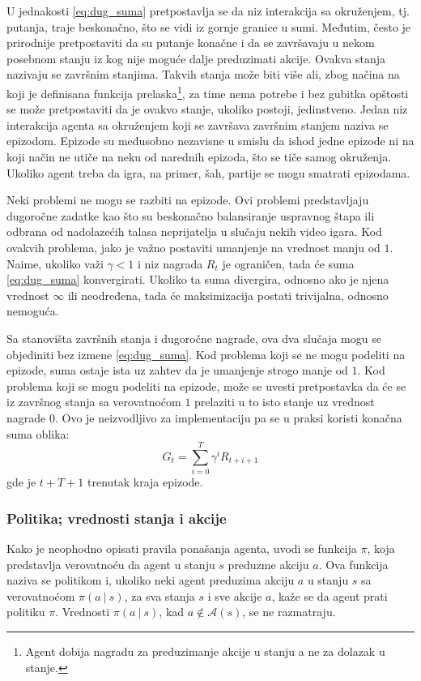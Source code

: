 U jednakosti \eqref{eq:dug_suma} pretpostavlja se da niz interakcija sa okruženjem, tj. putanja, traje beskonačno, što se vidi iz gornje granice u sumi. Međutim, često je prirodnije pretpostaviti da su putanje konačne i da se završavaju u nekom posebnom stanju iz kog nije moguće dalje preduzimati akcije. Ovakva stanja nazivaju se završnim stanjima. Takvih stanja može biti više ali, zbog načina na koji je definisana funkcija prelaska\footnote{Agent dobija nagradu za preduzimanje akcije u stanju a ne za dolazak u stanje.}, za time nema potrebe i bez gubitka opštosti se može pretpostaviti da je ovakvo stanje, ukoliko postoji, jedinstveno. Jedan niz interakcija agenta sa okruženjem koji se završava završnim stanjem naziva se epizodom. Epizode su međusobno nezavisne u smislu da ishod jedne epizode ni na koji način ne utiče na neku od narednih epizoda, što se tiče samog okruženja. Ukoliko agent treba da igra, na primer, šah, partije se mogu smatrati epizodama. 
\par 
Neki problemi ne mogu se razbiti na epizode. Ovi problemi predstavljaju dugoročne zadatke kao što su beskonačno balansiranje uspravnog štapa ili odbrana od nadolazećih talasa neprijatelja u slučaju nekih video igara. Kod ovakvih problema, jako je važno postaviti umanjenje na vrednost manju od $1$. Naime, ukoliko važi $\gamma < 1$ i niz nagrada $R_t$ je ograničen, tada će suma \eqref{eq:dug_suma} konvergirati. Ukoliko ta suma divergira, odnosno ako je njena vrednost $\infty$ ili neodređena, tada će maksimizacija postati trivijalna, odnosno nemoguća.
\par 
Sa stanovišta završnih stanja i dugoročne nagrade, ova dva slučaja mogu se objediniti bez izmene \eqref{eq:dug_suma}. Kod problema koji se ne mogu podeliti na epizode, suma ostaje ista uz zahtev da je umanjenje strogo manje od $1$. Kod problema koji se mogu podeliti na epizode, može se uvesti pretpostavka da će se iz završnog stanja sa verovatnoćom $1$ prelaziti u to isto stanje uz vrednost nagrade $0$. Ovo je neizvodljivo za implementaciju pa se u praksi koristi konačna suma oblika:
\begin{equation}
	G_t = \sum_{i=0}^{T} \gamma^iR_{t+i+1}
\end{equation}
gde je $t+T+1$ trenutak kraja epizode. 

\subsubsection{Politika; vrednosti stanja i akcije}

Kako je neophodno opisati pravila ponašanja agenta, uvodi se funkcija $\pi$, koja predstavlja verovatnoću da agent u stanju $s$ preduzme akciju $a$. Ova funkcija naziva se politikom i, ukoliko neki agent preduzima akciju $a$ u stanju $s$ sa verovatnoćom $\pi(a~|~s)$, za sva stanja $s$ i sve akcije $a$, kaže se da agent prati politiku $\pi$. Vrednosti $\pi(a~|~s)$, kad $a \notin \mathcal{A}(s)$, se ne razmatraju.

